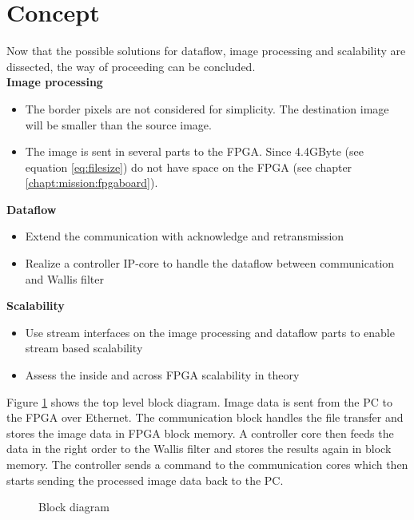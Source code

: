 \section{Concept} \label{chapt:mission:concept}
Now that the possible solutions for dataflow, image processing and scalability
are dissected, the way of proceeding can be concluded.\\


\textbf{Image processing}
    \begin{itemize}
        \item The border pixels are not considered for simplicity. The destination image will be smaller than the source image.
        \item The image is sent in several parts to the FPGA. Since 4.4GByte (see equation \ref{eq:filesize}) do not have space on the FPGA (see chapter \ref{chapt:mission:fpgaboard}).
    \end{itemize}

\textbf{Dataflow}
    \begin{itemize}
        \item Extend the communication with acknowledge and retransmission
        \item Realize a controller IP-core to handle the dataflow between
        communication and Wallis filter
    \end{itemize}

\textbf{Scalability}
    \begin{itemize}
        \item Use stream interfaces on the image processing and dataflow parts
        to enable stream based scalability
        \item Assess the inside and across FPGA scalability in theory
    \end{itemize}


Figure \ref{fig:blockdiagram} shows the top level block diagram. Image data is
sent from the PC to the FPGA over Ethernet. The communication block handles the
file transfer and stores the image data in FPGA block memory. A controller core
then feeds the data in the right order to the Wallis filter and stores the
results again in block memory. The controller sends a command to the
communication cores which then starts sending the processed image data back to
the PC.

\begin{figure}[b!]
    \centering
    
    \caption{Block diagram}
    \label{fig:blockdiagram}
\end{figure}


